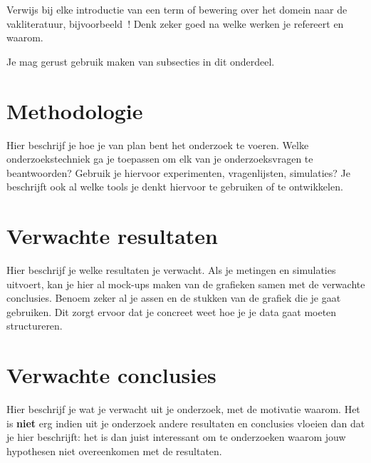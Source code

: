 Verwijs bij elke introductie van een term of bewering over het domein naar de vakliteratuur, bijvoorbeeld~\autocite{Doll1954}! Denk zeker goed na welke werken je refereert en waarom.


Je mag gerust gebruik maken van subsecties in dit onderdeel.

\section{Methodologie}
\label{sec:methodologie}

Hier beschrijf je hoe je van plan bent het onderzoek te voeren. Welke onderzoekstechniek ga je toepassen om elk van je onderzoeksvragen te beantwoorden? Gebruik je hiervoor experimenten, vragenlijsten, simulaties? Je beschrijft ook al welke tools je denkt hiervoor te gebruiken of te ontwikkelen.

\section{Verwachte resultaten}
\label{sec:verwachte_resultaten}

Hier beschrijf je welke resultaten je verwacht. Als je metingen en simulaties uitvoert, kan je hier al mock-ups maken van de grafieken samen met de verwachte conclusies. Benoem zeker al je assen en de stukken van de grafiek die je gaat gebruiken. Dit zorgt ervoor dat je concreet weet hoe je je data gaat moeten structureren.

\section{Verwachte conclusies}
\label{sec:verwachte_conclusies}

Hier beschrijf je wat je verwacht uit je onderzoek, met de motivatie waarom. Het is \textbf{niet} erg indien uit je onderzoek andere resultaten en conclusies vloeien dan dat je hier beschrijft: het is dan juist interessant om te onderzoeken waarom jouw hypothesen niet overeenkomen met de resultaten.

